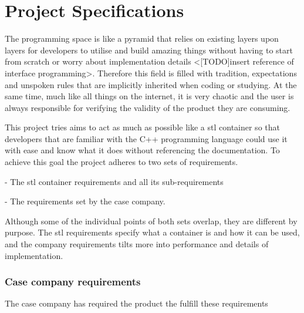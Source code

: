 \vspace{21.5pt}
\chapter{Project Specifications}

The programming space is like a pyramid that relies on existing layers upon layers for developers to utilise and build amazing things without having to start from scratch or worry about implementation details <[TODO]insert reference of interface programming>. Therefore this field is filled with tradition, expectations and unspoken rules that are implicitly inherited when coding or studying. At the same time, much like all things on the internet, it is very chaotic and the user is always responsible for verifying the validity of the product they are consuming.

This project tries aims to act as much as possible like a \gls{stl} container so that developers that are familiar with the C++ programming language could use it with ease and know what it does without referencing the documentation. To achieve this goal the project adheres to two sets of requirements.

-  The \gls{stl} container requirements and all its sub-requirements

-  The requirements set by the case company.

Although some of the individual points of both sets overlap, they are different by purpose. The \gls{stl} requirements specify what a container is and how it can be used, and the company requirements tilts more into performance and details of implementation.

\subsection{Case company requirements}

The case company has required the product the fulfill these requirements 

